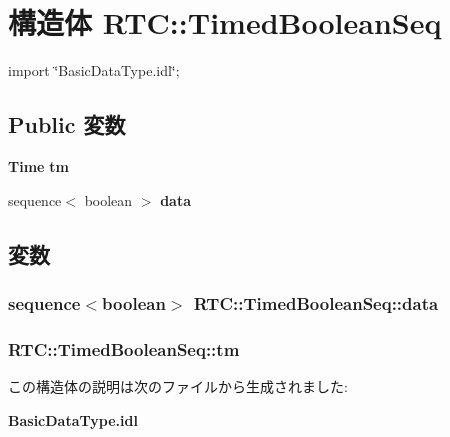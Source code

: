 \section{構造体 RTC::TimedBooleanSeq}
\label{structRTC_1_1TimedBooleanSeq}


{\ttfamily import \char`\"{}BasicDataType.idl\char`\"{};}

\subsection*{Public 変数}
\begin{DoxyCompactItemize}
\item 
{\bf Time} {\bf tm}
\item 
sequence$<$ boolean $>$ {\bf data}
\end{DoxyCompactItemize}


\subsection{変数}
\subsubsection[{data}]{\setlength{\rightskip}{0pt plus 5cm}sequence$<$boolean$>$ {\bf RTC::TimedBooleanSeq::data}}\label{structRTC_1_1TimedBooleanSeq_aae5d5a31e52ad9059ecc9eb7d9db8f01}
\subsubsection[{tm}]{ {\bf RTC::TimedBooleanSeq::tm}}\label{structRTC_1_1TimedBooleanSeq_a79569ec043f6684c520ec5abf81d1933}


この構造体の説明は次のファイルから生成されました:\begin{DoxyCompactItemize}
\item 
{\bf BasicDataType.idl}\end{DoxyCompactItemize}
